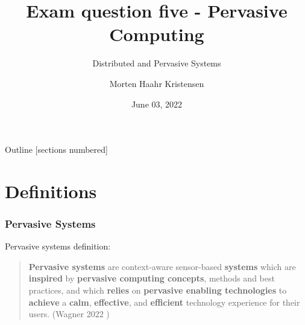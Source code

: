 \documentclass[10pt]{beamer}
\title[Pervasive Computing]{Exam question five - Pervasive Computing}
\subtitle{Distributed and Pervasive Systems}
\date{June 03, 2022}
\author[M.H. Kristensen]{Morten Haahr Kristensen}
\institute{Department of Electrical and Computer Engineering - Aarhus University}
\begin{document}
\maketitle

\begin{frame}{Outline}
  [sections numbered]
  \tableofcontents[hideallsubsections]
\end{frame}

\section{Definitions}

\begin{frame}
  \frametitle{Pervasive Systems}
  Pervasive systems definition: \\
  \vspace*{-1.0em}
  \begin{quote}
    \textbf{Pervasive systems} are context-aware sensor-based \textbf{systems} which are \textbf{inspired} by \textbf{pervasive computing concepts}, methods and best practices, and which \textbf{relies} on \textbf{pervasive enabling technologies} to \textbf{achieve} a \textbf{calm}, \textbf{effective}, and \textbf{efficient} technology experience for their users. (Wagner 2022 \cite{wagnerPervasiveComputing2022})
  \end{quote}
\end{frame}
\end{document}
